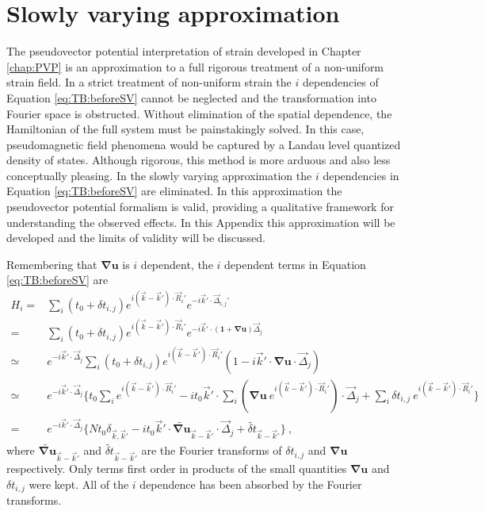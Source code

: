 \chapter{Slowly varying approximation \label{chap:idep}}

The pseudovector potential interpretation of strain developed in Chapter \ref{chap:PVP} is an approximation to a full rigorous treatment of a non-uniform strain field.
In a strict treatment of non-uniform strain the $i$ dependencies of Equation \ref{eq:TB:beforeSV} cannot be neglected and the transformation into Fourier space is obstructed.
Without elimination of the spatial dependence, the Hamiltonian of the full system must be painstakingly solved.
In this case, pseudomagnetic field phenomena would be captured by a Landau level quantized density of states.
Although rigorous, this method is more arduous and also less conceptually pleasing.
In the slowly varying approximation the $i$ dependencies in Equation \ref{eq:TB:beforeSV} are eliminated.
In this approximation the pseudovector potential formalism is valid, providing a qualitative framework for understanding the observed effects.
In this Appendix this approximation will be developed and the limits of validity will be discussed.

Remembering that $\bm{\nabla u}$ is $i$ dependent, the $i$ dependent terms in Equation \ref{eq:TB:beforeSV} are 
\begin{align*}
  H_i=&\sum_i \left( t_0+\delta t_{i,j} \right) e^{i(\vec{k}-\vec{k}')\cdot \vec{R}_i'}
  		e^{-i \vec{k}' \cdot \vec{\Delta}_{i,j}'} \\
  	 =&\sum_i \left( t_0+\delta t_{i,j} \right) e^{i(\vec{k}-\vec{k}')\cdot \vec{R}_i'}
  		e^{-i \vec{k}' \cdot (\bm{1}+\bm{\nabla u}) \vec{\Delta}_j} \\
  	 \simeq & e^{-i \vec{k}' \cdot \vec{\Delta}_j} \sum_i \left( t_0+\delta t_{i,j} \right)
  	 	e^{i(\vec{k}-\vec{k}')\cdot \vec{R}_i'} \left(1-i \vec{k}' \cdot \bm{\nabla u} \cdot \vec{\Delta}_j \right) \\
  	 \simeq & e^{-i \vec{k}' \cdot \vec{\Delta}_j} \bigg \{
  	 	t_0 \sum_i e^{i(\vec{k}-\vec{k}')\cdot \vec{R}_i'} 
  	 	-i t_0 \vec{k}' \cdot \sum_i \left( \bm{\nabla u} \ e^{i(\vec{k}-\vec{k}')\cdot \vec{R}_i'} \right) \cdot \vec{\Delta}_j
  	 	+\sum_i \delta t_{i,j} \  e^{i(\vec{k}-\vec{k}')\cdot \vec{R}_i'}
  	 	\bigg \} \\
  	 =& e^{-i \vec{k}' \cdot \vec{\Delta}_j} \bigg \{
      N t_0 \delta_{\vec{k},\vec{k}'}
  	 	-i t_0 \vec{k}' \cdot \widetilde{\bm{\nabla u}}_{\vec{k}-\vec{k}'} \cdot \vec{\Delta}_j + \widetilde{\delta t}_{\vec{k}-\vec{k}'} \bigg \} \ ,
\end{align*}
where $\widetilde{\bm{\nabla u}}_{\vec{k}-\vec{k}'}$ and $\widetilde{\delta t}_{\vec{k}-\vec{k}'}$ are the Fourier transforms of $\delta t_{i,j}$ and $\bm{\nabla u}$ respectively.
Only terms first order in products of the small quantities $\bm{\nabla u}$ and $\delta t_{i,j}$ were kept.
All of the $i$ dependence has been absorbed by the Fourier transforms.


